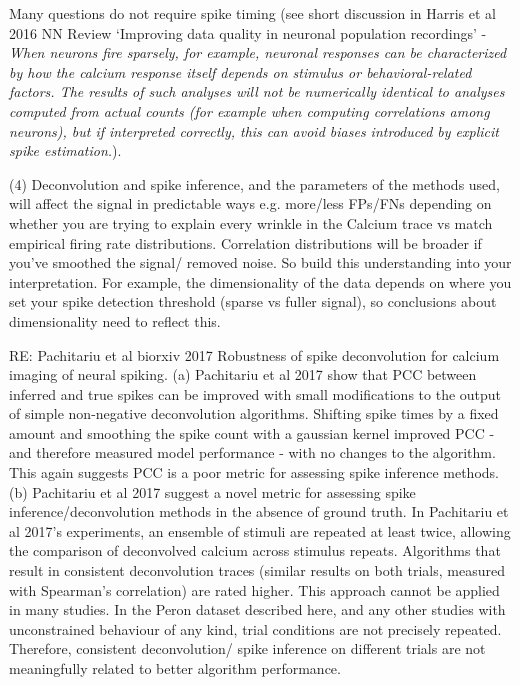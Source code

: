 \documentclass[a4paper,10pt,twocolumn]{article}
\begin{document}
Many questions do not require spike timing (see short discussion in Harris et al 2016 NN Review `Improving data quality in neuronal population recordings' - \emph{When neurons fire sparsely, for example, neuronal responses can be characterized by how the calcium response itself depends on stimulus or behavioral-related factors. The results of such analyses will not be numerically identical to analyses computed from actual counts (for example when computing correlations among neurons), but if interpreted correctly, this can avoid biases introduced by explicit spike estimation.}). 

(4) Deconvolution and spike inference, and the parameters of the methods used, will affect the signal in predictable ways e.g. more/less FPs/FNs depending on whether you are trying to explain every wrinkle in the Calcium trace vs match empirical firing rate distributions. Correlation distributions will be broader if you've smoothed the signal/ removed noise. So build this understanding into your interpretation.
For example, the dimensionality of the data depends on where you set your spike detection threshold (sparse vs fuller signal), so conclusions about dimensionality need to reflect this.

RE: Pachitariu et al biorxiv 2017 Robustness of spike deconvolution for calcium imaging of neural spiking.
(a) Pachitariu et al 2017 show that PCC between inferred and true spikes can be improved with small modifications to the output of simple non-negative deconvolution algorithms. Shifting spike times by a fixed amount and smoothing the spike count with a gaussian kernel improved PCC - and therefore measured model performance - with no changes to the algorithm. This again suggests PCC is a poor metric for assessing spike inference methods.
(b) Pachitariu et al 2017 suggest a novel metric for assessing spike inference/deconvolution methods in the absence of ground truth. In Pachitariu et al 2017's experiments, an ensemble of stimuli are repeated at least twice, allowing the comparison of deconvolved calcium across stimulus repeats. Algorithms that result in consistent deconvolution traces (similar results on both trials, measured with Spearman's correlation) are rated higher. This approach cannot be applied in many studies. In the Peron dataset described here, and any other studies with unconstrained behaviour of any kind, trial conditions are not precisely repeated. Therefore, consistent deconvolution/ spike inference on different trials are not meaningfully related to better algorithm performance. 
\end{document}
